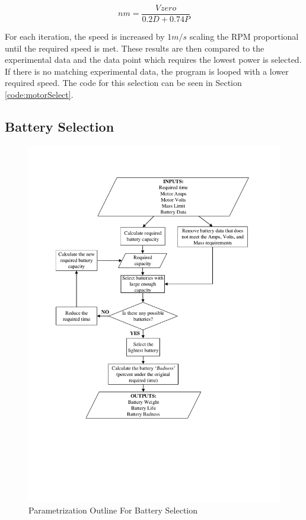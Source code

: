 \documentclass[../main.tex]{subfiles}
\begin{document}
\begin{equation}
nm = \frac{V_{}zero}{0.2D+0.74P}
\end{equation}

For each iteration, the speed is increased by $1m/s$ scaling the RPM proportional until the required speed is met. These results are then compared to the experimental data and the data point which requires the lowest power is selected. If there is no matching experimental data, the program is looped with a lower required speed. The code for this selection can be seen in Section \ref{code:motorSelect}.	

\subsection{Battery Selection} \label{batterySelect}

\begin{figure}[H]
	\centering
	\includegraphics[width=0.95\linewidth]{img/paramaterization/batteryChoice.pdf}
	\caption{Parametrization Outline For Battery Selection}
	\label{fig:batteryOutline}
\end{figure}
\end{document}
